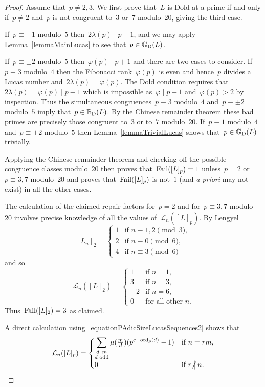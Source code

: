 \documentclass[]{interact}
\theoremstyle{plain}
\numberwithin{equation}{section} %
\numberwithin{table}{section} %
\numberwithin{figure}{section}
\def\gooddoldprimes{\mathbb{G}_{\rm{D}}}
\def\baddoldprimes{\mathbb{B}_{\rm{D}}}
\newcommand\ord{{\rm{ord}}}
\newcommand\failure{{\rm{Fail}}}
\newcommand\least{{\mathcal{L}}}
\newcommand\notdivides{\mathrel{\kern-3pt\not\!\kern4.3pt\bigm|}}
\newcommand\divides\mid
\newcommand\smalldivides{\mathrel{\kern-2pt\kern3.5pt|}}
\begin{document}
\begin{proof}
Assume that~$p\neq2,3$.
We first prove that~$L$ is Dold at a prime
if and only if~$p\neq2$ and~$p$ is not congruent to~$3$
or~$7$ modulo~$20$, giving the third case.

If~$p\equiv\pm1$ modulo~$5$ then~$2\lambda(p)\divides p-1$,
and we may apply Lemma~\ref{lemmaMainLucas}
to see that~$p\in\gooddoldprimes(L)$.

If~$p\equiv\pm2$ modulo~$5$ then~$\varphi(p)\divides p+1$
and there are two cases to consider.
If~$p\equiv3$ modulo~$4$ then the Fibonacci rank~$\varphi(p)$
is even and hence~$p$ divides a Lucas number
and~$2\lambda(p)=\varphi(p)$.
The Dold condition requires that~$2\lambda(p)=\varphi(p)\divides p-1$
which is impossible as~$\varphi\divides p+1$ and~$\varphi(p)>2$
by inspection. Thus the simultaneous congruences~$p\equiv3$
modulo~$4$ and~$p\equiv\pm2$ modulo~$5$ imply that~$p\in\baddoldprimes(L)$.
By the Chinese remainder theorem these bad primes
are precisely those congruent to~$3$ or to~$7$ modulo~$20$.
If~$p\equiv1$ modulo~$4$ and~$p\equiv\pm2$ modulo~$5$
then Lemma~\ref{lemmaTrivialLucas} shows that~$p
\in\gooddoldprimes(L)$ trivially.

Applying the Chinese remainder theorem and checking
off the possible congruence classes modulo~$20$ then
proves that~$\failure([L]_p)=1$ unless~$p=2$ or~$p\equiv3,7$ modulo~$20$
and proves that~$\failure([L]_p)$ is not~$1$ (and
{\it{a priori}} may not exist) in all the other
cases.

The calculation of the claimed repair factors
for~$p=2$ and for~$p\equiv3,7$ modulo~$20$
involves precise knowledge of all the values
of~$\least_n([L]_p)$.
By Lengyel~\cite[Lemma~2]{MR1337793}
\[
[L_n]_2
=
\begin{cases}
1&\mbox{if }n\equiv1,2\pmod{3},\\
2&\mbox{if }n\equiv0\pmod{6},\\
4&\mbox{if }n\equiv3\pmod{6}
\end{cases}
\]
and so
\[
\least_n([L]_2)
=
\begin{cases}
1&\mbox{if }n=1,\\
3&\mbox{if }n=3,\\
-2&\mbox{if }n=6,\\
0&\mbox{for all other $n$}.
\end{cases}
\]
Thus~$\failure([L]_2)=3$ as claimed.

A direct calculation
using~\eqref{equationPAdicSizeLucasSequences2} shows
that
\begin{equation}\label{equationAA}
\least_{n}([L]_p)
=
\begin{cases}
\displaystyle\sum_{\substack{d\smalldivides m\\d\text{ odd}}}
\mu(\tfrac{m}{d})(p^{e+\ord_p(d)}-1)
&\mbox{if }n=rm,\\
0&\mbox{if }r\notdivides n.
\end{cases}
\end{equation}


\end{proof}
\end{document}

